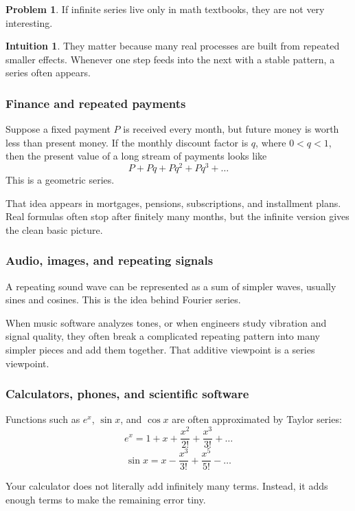 \documentclass[11pt,a4paper]{article}
\theoremstyle{definition}
\newtheorem*{problem}{Problem}
\newtheorem*{intuition}{Intuition}
\theoremstyle{plain}
\begin{document}
\begin{problem}
If infinite series live only in math textbooks, they are not very interesting.
\end{problem}

\begin{intuition}
They matter because many real processes are built from repeated smaller effects.
Whenever one step feeds into the next with a stable pattern, a series often appears.
\end{intuition}

\subsubsection*{Finance and repeated payments}

Suppose a fixed payment \(P\) is received every month, but future money is worth less than present money.
If the monthly discount factor is \(q\), where \(0<q<1\), then the present value of a long stream of payments looks like
\[
P + Pq + Pq^2 + Pq^3 + \dots
\]
This is a geometric series.

That idea appears in mortgages, pensions, subscriptions, and installment plans.
Real formulas often stop after finitely many months, but the infinite version gives the clean basic picture.

\subsubsection*{Audio, images, and repeating signals}

A repeating sound wave can be represented as a sum of simpler waves, usually sines and cosines.
This is the idea behind Fourier series.

When music software analyzes tones, or when engineers study vibration and signal quality, they often break a complicated repeating pattern into many simpler pieces and add them together.
That additive viewpoint is a series viewpoint.

\subsubsection*{Calculators, phones, and scientific software}

Functions such as \(e^x\), \(\sin x\), and \(\cos x\) are often approximated by Taylor series:
\[
e^x = 1 + x + \frac{x^2}{2!} + \frac{x^3}{3!} + \dots
\]
\[
\sin x = x - \frac{x^3}{3!} + \frac{x^5}{5!} - \dots
\]

Your calculator does not literally add infinitely many terms.
Instead, it adds enough terms to make the remaining error tiny.
\end{document}
